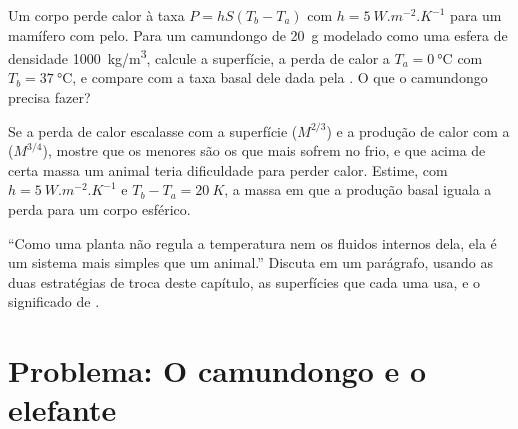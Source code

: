 \begin{exercise}[$\star\star\star$]\label{exo:b1:organism-environment:10}
Um corpo perde calor à taxa $P = hS(T_b - T_a)$ com
$h = \qty{5}{W.m^{-2}.K^{-1}}$ para um mamífero com pelo. Para um
camundongo de \qty{20}{g} modelado como uma esfera de densidade
\qty{1000}{kg/m^3}, calcule a superfície, a perda de calor a
$T_a = \qty{0}{\celsius}$ com $T_b =
\qty{37}{\celsius}$, e compare com a taxa basal dele dada pela . O que o camundongo precisa fazer?
\end{exercise}

\begin{exercise}[$\star\star\star$]\label{exo:b1:organism-environment:11}
Se a perda de calor escalasse com a superfície ($M^{2/3}$) e a produção
de calor com a  ($M^{3/4}$), mostre que os menores
 são os que mais sofrem no frio, e que acima de certa massa um
animal teria dificuldade para perder calor. Estime, com
$h = \qty{5}{W.m^{-2}.K^{-1}}$ e $T_b - T_a = \qty{20}{K}$, a massa em
que a produção basal iguala a perda para um corpo esférico.
\end{exercise}

\begin{exercise}[$\star\star\star$]\label{exo:b1:organism-environment:12}
``Como uma planta não regula a temperatura nem os fluidos internos dela,
ela é um sistema mais simples que um animal.'' Discuta em um parágrafo,
usando as duas estratégias de troca deste capítulo, as superfícies que
cada uma usa, e o significado de .
\end{exercise}

\section{Problema: O camundongo e o elefante}

